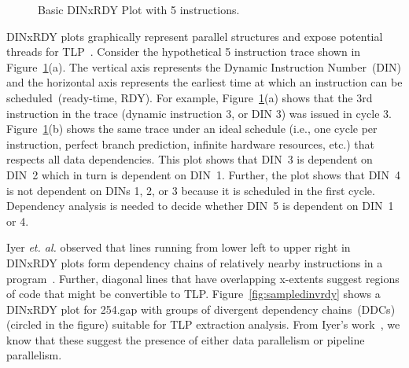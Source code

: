 \documentclass[defaultstyle,11pt]{thesis}
\begin{document}
\begin{figure}
  \begin{center}
	\hspace{.9in}
  \end{center}
  \caption{Basic DINxRDY Plot with 5 instructions.}
  \label{fig:ex_dinxrdy}
\end{figure}

DINxRDY plots graphically represent parallel structures and
expose potential threads for TLP~\cite{iyer:05:epic}.  Consider the
hypothetical 5 instruction trace shown in
Figure~\ref{fig:ex_dinxrdy}(a).  The vertical axis represents the
Dynamic Instruction Number~(DIN) and the horizontal axis represents
the earliest time at which an instruction can be
scheduled~(ready-time, RDY).  For example,
Figure~\ref{fig:ex_dinxrdy}(a) shows that the 3rd instruction in the
trace (dynamic instruction 3, or DIN 3) was issued in cycle 3.
Figure~\ref{fig:ex_dinxrdy}(b) shows the same trace under an ideal
schedule (i.e., one cycle per instruction, perfect branch
prediction, infinite hardware resources, etc.) that respects all data
dependencies.  This plot shows that DIN~3 is dependent on DIN~2 which
in turn is dependent on DIN~1.  Further, the plot shows that DIN~4
is not dependent on DINs 1, 2, or 3 because it is scheduled in the
first cycle.  Dependency analysis is needed to decide whether DIN~5 is
dependent on DIN~1 or 4.

Iyer \textit{et. al.} observed that lines running from lower left to
upper right in DINxRDY plots form dependency chains of relatively
nearby instructions in a program~\cite{iyer:05:epic}.  Further,
diagonal lines that have overlapping x-extents suggest regions of code
that might be convertible to TLP. Figure~\ref{fig:sampledinvrdy} shows
a DINxRDY plot for 254.gap with groups of divergent dependency
chains~(DDCs) (circled in the figure) suitable for TLP extraction
analysis. From Iyer's work~\cite{iyer:05:epic}, we know that these
suggest the presence of either data parallelism or pipeline
parallelism.
\end{document}
